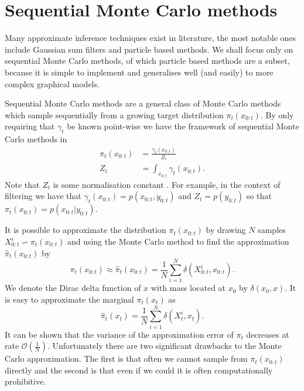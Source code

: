 \section{Sequential Monte Carlo methods}
\label{sec_asir}
Many approximate inference techniques exist in literature, the most notable ones include Gaussian sum filters \cite{gsf1} and particle based methods. We shall focus only on sequential Monte Carlo methods, of which particle based methods are a subset, because it is simple to implement and generalises well (and easily) to more complex graphical models. 

Sequential Monte Carlo methods are a general class of Monte Carlo methods which sample sequentially from a growing target distribution $\pi_t(x_{0:t})$. By only requiring that $\gamma_t$ be known point-wise we have the framework of sequential Monte Carlo methods in 
\begin{equation}
\begin{aligned}
\pi_t(x_{0:t}) &= \frac{\gamma_t(x_{0:t})}{Z_t} \\
Z_t &= \int_{x_{0:t}} \gamma_t(x_{0:t}).
\end{aligned}
\label{eq_SMC1}
\end{equation} 
Note that $Z_t$ is some normalisation constant \cite{pftut}.
For example, in the context of filtering we have that $\gamma_t(x_{0:t}) = p(x_{0:t},y_{0:t})$ and $Z_t = p(y_{0:t})$ so that $\pi_t(x_{0:t}) = p(x_{0:t}|y_{0:t})$. 

It is possible to approximate the distribution $\pi_t(x_{0:t})$ by drawing $N$ samples $X_{0:t}^i \backsim \pi_t(x_{0:t})$ and using the Monte Carlo method to find the approximation $\hat{\pi}_t(x_{0:t})$ by
\begin{equation}
\pi_t(x_{0:t}) \approx \hat{\pi}_t(x_{0:t}) = \frac{1}{N}\sum_{i=1}^N \delta(X^i_{0:t}, x_{0:t}).
\label{eq_SMC2}
\end{equation}
We denote the Dirac delta function of $x$ with mass located at $x_0$ by $\delta(x_0,x)$. It is easy to approximate the marginal $\pi_t(x_{t})$ as
\begin{equation}
\hat{\pi}_t(x_{t}) = \frac{1}{N}\sum_{i=1}^N \delta(X^i_{t}, x_{t}).
\label{eq_SMC3}
\end{equation}
It can be shown that the variance of the approximation error of $\pi_t$ decreases at rate $\mathcal{O}(\frac{1}{N})$. Unfortunately there are two significant drawbacks to the Monte Carlo approximation. The first is that often we cannot sample from $\pi_t(x_{0:t})$ directly and the second is that even if we could it is often computationally prohibitive. 

